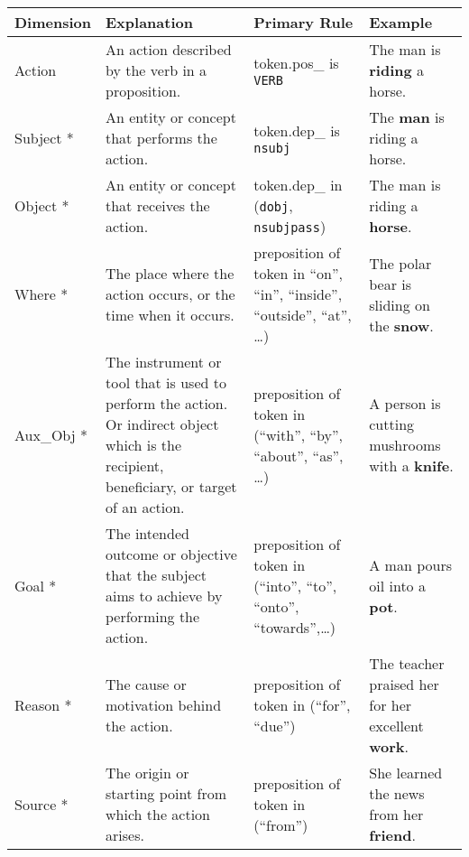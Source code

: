 \begin{table*}[h!]
	\footnotesize
	\centering 
    \small 
    \renewcommand{\arraystretch}{1.5}
	{
		\begin{tabular}{p{}|p{}|p{}|p{}}
			\toprule 
			\textbf{Dimension} & \textbf{Explanation} & \textbf{Primary Rule} & \textbf{Example}\\
            
			\midrule
			Action & An action described by the verb in a proposition. & token.pos\_ is \texttt{VERB} & The man is \textbf{riding} a horse. \\
            
			Subject * & An entity or concept that performs the action. & token.dep\_ is \texttt{nsubj} & The \textbf{man} is riding a horse. \\
            
            Object * & An entity or concept that receives the action. & token.dep\_ in (\texttt{dobj}, \texttt{nsubjpass}) & The man is riding a \textbf{horse}. \\		
            \midrule
            
            Where *	&The place where the action occurs, or the time when it occurs.	& preposition of token in ``on'', ``in'', ``inside'', ``outside'', ``at'', \ldots)	&The polar bear is sliding on the \textbf{snow}.	\\
            
            Aux\_Obj *	&The instrument or tool that is used to perform the action. Or indirect object which is the recipient, beneficiary, or target of an action.  	& preposition of token in (``with'', ``by'', ``about'', ``as'', \ldots)	&A person is cutting mushrooms with a \textbf{knife}.		\\	
            
            Goal *	&The intended outcome or objective that the subject aims to achieve by performing the action.	& preposition of token in (``into'', ``to'', ``onto'', ``towards'',\ldots)	&A man pours oil into a \textbf{pot}.\\
            
            Reason *	&The cause or motivation behind the action.	& preposition of token in (``for'', ``due'')	&The teacher praised her for her excellent \textbf{work}.		\\
            
            Source *	&The origin or starting point from which the action arises. 	&preposition of token in (``from'')	&She learned the news from her \textbf{friend}.		\\	
            \midrule
            

\end{tabular}}
\end{table*}
